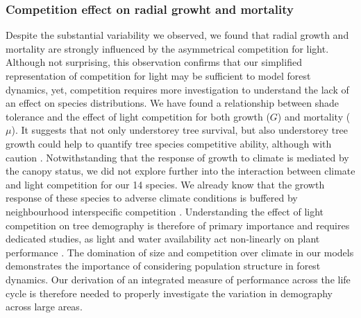 \subsubsection{Competition effect on radial growht and mortality}
Despite the substantial variability we observed, we found that radial growth and mortality are strongly influenced by the asymmetrical competition for light. Although not surprising, this observation confirms that our simplified representation of competition for light may be sufficient to model forest dynamics, yet, competition requires more investigation to understand the lack of an effect on species distributions. We have found a relationship between shade tolerance and the effect of light competition for both growth ($ G $) and mortality ($ \mu $). It suggests that not only understorey tree survival, but also understorey tree growth could help to quantify tree species competitive ability, although with caution \citep{Feng2018}. Notwithstanding that the response of growth to climate is mediated by the canopy status, we did not explore further into the interaction between climate and light competition for our 14 species. We already know that the growth response of these species to adverse climate conditions is buffered by neighbourhood interspecific competition \citep{Aussenac2019}. Understanding the effect of light competition on tree demography is therefore of primary importance and requires dedicated studies, as light and water availability act non-linearly on plant performance \citep{Holmgren2012}. The domination of size and competition over climate in our models demonstrates the importance of considering population structure in forest dynamics. Our derivation of an integrated measure of performance across the life cycle is therefore needed to properly investigate the variation in demography across large areas. \\

